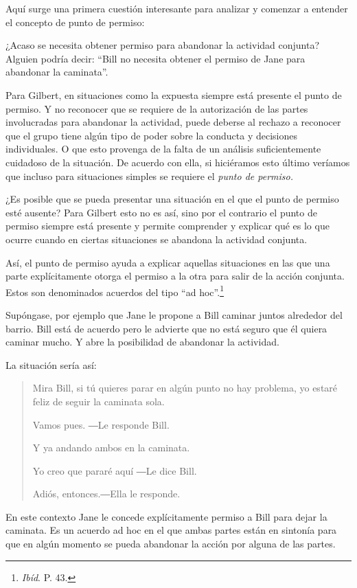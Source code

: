 \documentclass[oneside]{book}
\begin{document}
Aquí surge una primera cuestión interesante para analizar y comenzar a entender el concepto de punto de permiso: 

¿Acaso se necesita obtener permiso para abandonar la actividad conjunta? Alguien  podría decir: “Bill no necesita obtener el permiso de Jane para abandonar la caminata”.

Para Gilbert, en situaciones como la expuesta siempre está presente el punto de permiso. Y no reconocer que se requiere de la autorización de las partes involucradas para abandonar la actividad, puede deberse al rechazo a reconocer que el grupo tiene algún tipo de poder sobre la conducta y decisiones individuales. O que esto provenga de la falta de un análisis suficientemente cuidadoso de la situación. De acuerdo con ella, si hiciéramos esto último veríamos que incluso para situaciones simples se requiere el \textit{punto de permiso.}

¿Es posible que se pueda presentar una situación en el que el punto de permiso esté ausente? Para Gilbert esto no es así, sino por el contrario el punto de permiso siempre está presente y permite comprender y explicar qué es lo que ocurre cuando en ciertas situaciones se abandona la actividad conjunta. 

Así, el punto de permiso ayuda a explicar aquellas situaciones en las que una parte explícitamente otorga el permiso a la otra para salir de la acción conjunta. Estos son denominados acuerdos del tipo “ad hoc”.\footnote{\textit{Ibíd}. P. 43.}

Supóngase, por ejemplo que Jane le propone a Bill caminar juntos alrededor del barrio. Bill está de acuerdo pero le advierte que no está seguro que él quiera caminar mucho. Y abre la posibilidad de abandonar la actividad.

La situación sería así:
\begin{quote}
Mira Bill, si tú quieres parar en algún punto no hay problema, yo estaré feliz de seguir la caminata sola. 

Vamos pues. ―Le responde Bill.

Y ya andando ambos en la caminata. 

Yo creo que pararé aquí ―Le dice Bill.

Adiós, entonces.―Ella le responde. 
\end{quote}

En este contexto Jane le concede explícitamente permiso a Bill para dejar la caminata. Es un acuerdo ad hoc en el que ambas partes están en sintonía para que en algún momento se pueda abandonar la acción por alguna de las partes.
\end{document}
